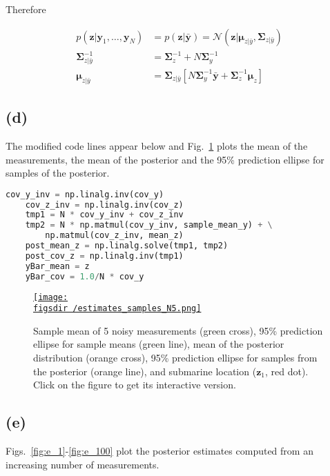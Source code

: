 \documentclass[12pt]{article}
\def\figsdir{../../../../../../code/scripts/probability/unsupervisedInferenceInTheLinearGaussianModel/figures/}
\def\figsURLdir{http://www.gatsby.ucl.ac.uk/~rapela/gcnuBridging2023/lectures/9_inference/inferenceInTheLinearGaussianModel/exercises/figures/}
\begin{document}
\noindent Therefore

\begin{align}
    p(\mathbf{z}|\mathbf{y}_1,\ldots,\mathbf{y}_N)&=p(\mathbf{z}|\bar{\mathbf{y}})=\mathcal{N}(\mathbf{z}|\boldsymbol{\mu}_{z|\bar{y}},\boldsymbol{\Sigma}_{z|\bar{y}})\nonumber\\
    \boldsymbol{\Sigma}^{-1}_{z|\bar{y}}&=\boldsymbol{\Sigma}_z^{-1}+N\boldsymbol{\Sigma}_y^{-1}\label{eq:postCov}\\
    \boldsymbol{\mu}_{z|\bar{y}}&=\boldsymbol{\Sigma}_{z|\bar{y}}\left[N\boldsymbol{\Sigma}_y^{-1}\bar{\mathbf{y}}+\boldsymbol{\Sigma}_z^{-1}\boldsymbol{\mu}_z\right]\label{eq:postMean}
\end{align}

\subsection*{(d)} The modified code lines appear below and Fig.~\ref{fig:d}
plots the mean of the measurements, the mean of the posterior and the 95\%
prediction ellipse for samples of the posterior.

\begin{lstlisting}[language=Python,frame=single]
    cov_y_inv = np.linalg.inv(cov_y)
    cov_z_inv = np.linalg.inv(cov_z)
    tmp1 = N * cov_y_inv + cov_z_inv
    tmp2 = N * np.matmul(cov_y_inv, sample_mean_y) + \
        np.matmul(cov_z_inv, mean_z)
    post_mean_z = np.linalg.solve(tmp1, tmp2)
    post_cov_z = np.linalg.inv(tmp1)
    yBar_mean = z
    yBar_cov = 1.0/N * cov_y
\end{lstlisting}

\begin{center}
    \begin{figure}[H]
        \href{\figsURLdir/estimates_samples_N5.html}{\texttt{[image: \\figsdir /estimates\_samples\_N5.png]}}
        \caption{Sample mean of 5 noisy measurements (green cross), 95\%
        prediction ellipse for sample means (green line), mean of the posterior
        distribution (orange cross), 95\% prediction ellipse for samples from
        the posterior (orange line), and submarine location ($\mathbf{z}_1$, red
        dot). Click on the figure to get its interactive version.}
        \label{fig:d}
    \end{figure}
\end{center}

\subsection*{(e)} Figs.~\ref{fig:e_1}-\ref{fig:e_100} plot the posterior
estimates computed from an increasing number of measurements.
\end{document}
